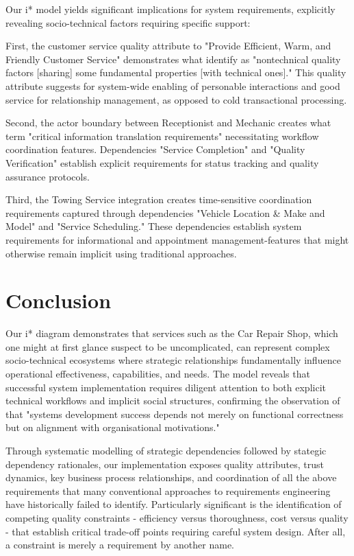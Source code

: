 \documentclass[14pt,a4paper]{article}
\begin{document}
Our i* model yields significant implications for system requirements, explicitly revealing socio-technical factors requiring specific support:

First, the customer service quality attribute to "Provide Efficient, Warm, and Friendly Customer Service" demonstrates what \textit{\parencite[p. 304]{Carvallo2006}} identify as "nontechnical quality factors [sharing] some fundamental properties [with technical ones]." This quality attribute suggests for system-wide enabling of personable interactions and good service for relationship management, as opposed to cold transactional processing.

Second, the actor boundary between Receptionist and Mechanic creates what \textit{\parencite[p. 48]{Gorton2017}} term "critical information translation requirements" necessitating workflow coordination features. Dependencies "Service Completion" and "Quality Verification" establish explicit requirements for status tracking and quality assurance protocols.

Third, the Towing Service integration creates time-sensitive coordination requirements captured through dependencies "Vehicle Location \& Make and Model" and "Service Scheduling." These dependencies establish system requirements for informational and appointment management-features that might otherwise remain implicit using traditional approaches.

\section{Conclusion}

Our i* diagram demonstrates that services such as the Car Repair Shop, which one might at first glance suspect to be uncomplicated, can represent complex socio-technical ecosystems where strategic relationships fundamentally influence operational effectiveness, capabilities, and needs. The model reveals that successful system implementation requires diligent attention to both explicit technical workflows and implicit social structures, confirming the observation of \textit{\parencite[p. 47]{Lezcano2022}} that "systems development success depends not merely on functional correctness but on alignment with organisational motivations."

Through systematic modelling of strategic dependencies followed by stategic dependency rationales, our implementation exposes quality attributes, trust dynamics, key business process relationships, and coordination of all the above requirements that many conventional approaches to requirements engineering have historically failed to identify. Particularly significant is the identification of competing quality constraints - efficiency versus thoroughness, cost versus quality - that establish critical trade-off points requiring careful system design. After all, a constraint is merely a requirement by another name.
\end{document}
